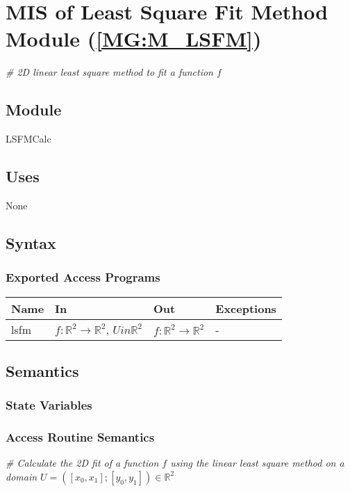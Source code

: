 \documentclass[12pt, titlepage]{article}
\begin{document}
\section{MIS of Least Square Fit Method Module (\texorpdfstring{\cref{MG:M_LSFM}}))} \label{MIS_LSFM}

\textit{{\#} 2D linear least square method to fit a function $f$} \medskip

\subsection{Module}
LSFMCalc
\subsection{Uses}
None
\subsection{Syntax}

\subsubsection{Exported Access Programs}

\begin{center}
\begin{tabular}{p{2cm} p{4cm} p{4cm} p{2cm}}
\hline
\textbf{Name} & \textbf{In} & \textbf{Out} & \textbf{Exceptions} \\
\hline
lsfm & $f:\mathbb{R}^2\rightarrow\mathbb{R}^2$, $U in \mathbb{R}^2$ & $f:\mathbb{R}^2\rightarrow\mathbb{R}^2$ & - \\
\hline
\end{tabular}
\end{center}

\subsection{Semantics}

\subsubsection{State Variables}


\subsubsection{Access Routine Semantics}

\noindent\textit{{\#} Calculate the 2D fit of a function $f$ using the linear least square method on a domain $U=([x_0,x_1];[y_0,y_1]) \in \mathbb{R}^2$} \medskip
\end{document}
